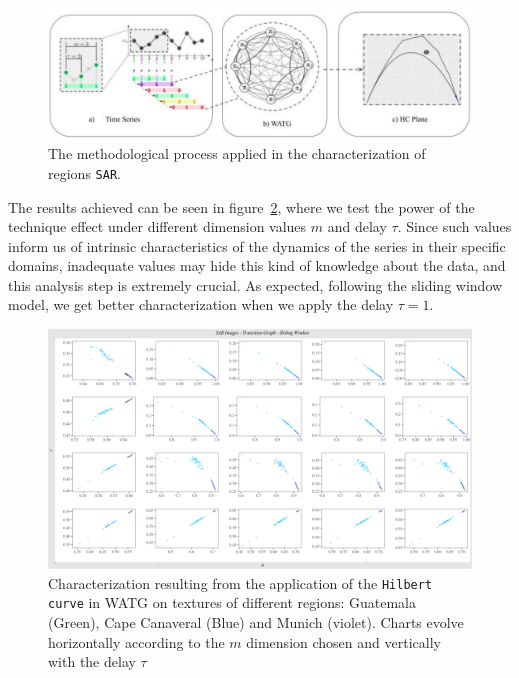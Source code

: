 \documentclass{isprs}
\begin{document}
	\begin{figure}[hbt]
		\centering
		\includegraphics[scale = 0.25]{Figures/WATG.pdf}
		\caption{The methodological process applied in the characterization of regions \texttt{SAR}.}
		\label{fig:WATG}
	\end{figure}
	
	The results achieved can be seen in figure~\ref{fig:Regions}, where we test the power of the technique effect under different dimension values $m$ and delay $\tau$.
	Since such values inform us of intrinsic characteristics of the dynamics of the series in their specific domains, inadequate values may hide this kind of knowledge about the data, and this analysis step is extremely crucial.
	As expected, following the sliding window model, we get better characterization when we apply the delay $\tau = 1$.

\begin{figure}
	\centering
	\includegraphics[width=1.05\textwidth]{Figures/transitionGraphHilbert.pdf}
	\caption{Characterization resulting from the application of the \texttt{Hilbert curve} in WATG on textures of different regions: Guatemala (Green), Cape Canaveral (Blue) and Munich (violet). Charts evolve horizontally according to the $m$ dimension chosen and vertically with the delay $\tau$}
	\label{fig:Regions}
\end{figure}
\end{document}
